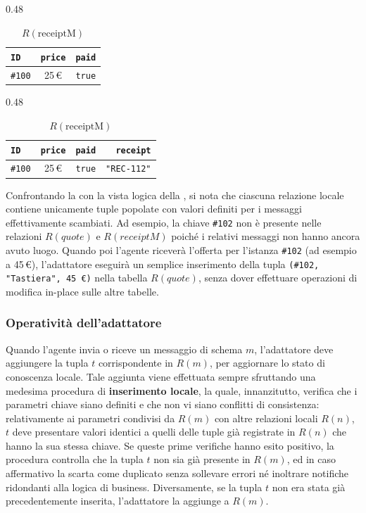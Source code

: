 \begin{table}[htbp]
\begin{subtable}[t]{0.48\textwidth}
\centering
\caption*{$R(\text{payM})$}
\begin{tabular}{lcr}
\toprule
\textbf{\texttt{ID}} & \textbf{\texttt{price}} & \textbf{\texttt{paid}} \\
\midrule
\texttt{\#100} & 25\,€ & \texttt{true} \\
\bottomrule
\end{tabular}
\end{subtable}
\hfill
\begin{subtable}[t]{0.48\textwidth}
\centering
\caption*{$R(\text{receiptM})$}
\begin{tabular}{lccr}
\toprule
\textbf{\texttt{ID}} & \textbf{\texttt{price}} & \textbf{\texttt{paid}} & \textbf{\texttt{receipt}} \\
\midrule
\texttt{\#100} & 25\,€ & \texttt{true} & \texttt{"REC-112"} \\
\bottomrule
\end{tabular}
\end{subtable}

\end{table}

Confrontando la  con la vista logica della , si nota
che ciascuna relazione locale contiene unicamente tuple popolate con valori definiti per i
messaggi effettivamente scambiati. 
Ad esempio, la chiave \texttt{\#102} non è presente nelle relazioni $R(quote)$ e $R(receiptM)$ poiché i relativi messaggi non 
hanno ancora avuto luogo.
Quando poi l'agente riceverà l'offerta per l'istanza \texttt{\#102} (ad esempio a 45\,€), l'adattatore
eseguirà un semplice inserimento della tupla \texttt{(\#102, "Tastiera", 45\,€)} nella tabella $R(quote)$, senza 
dover effettuare operazioni di modifica in-place sulle altre tabelle.

\subsubsection{Operatività dell'adattatore}\label{bspl:operativita-adattatore}

Quando l'agente invia o riceve un messaggio di schema $m$, l'adattatore deve aggiungere la tupla $t$ 
corrispondente in $R(m)$, per aggiornare lo stato di conoscenza locale.
Tale aggiunta viene effettuata sempre sfruttando una medesima procedura di \textbf{inserimento locale},
la quale, innanzitutto, verifica che i parametri chiave
siano definiti e che non vi siano conflitti di consistenza: relativamente ai parametri condivisi
da $R(m)$ con altre relazioni locali $R(n)$, $t$ deve presentare valori identici a quelli delle tuple
già registrate in $R(n)$ che hanno la sua stessa chiave.
Se queste prime verifiche hanno esito positivo, la procedura controlla che la tupla $t$ non sia già presente
in $R(m)$, ed in caso affermativo la scarta come duplicato senza sollevare
errori né inoltrare notifiche ridondanti alla logica di business.
Diversamente, se la tupla $t$ non era stata già precedentemente inserita, l'adattatore la aggiunge a $R(m)$.

